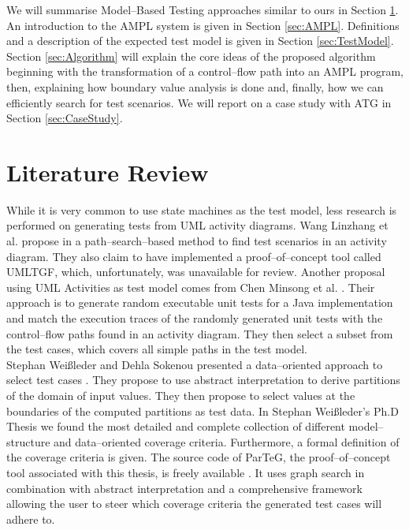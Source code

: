 \documentclass[runningheads,a4paper]{llncs}%
\begin{document}
We will summarise Model--Based Testing approaches similar to ours in Section \ref{sec:LiteratureReview}. An introduction to the AMPL system is given in Section \ref{sec:AMPL}. Definitions and a description of the expected test model is given in Section \ref{sec:TestModel}. Section \ref{sec:Algorithm} will explain the core ideas of the proposed algorithm beginning with the transformation of a control--flow path into an AMPL program, then, explaining how boundary value analysis is done and, finally, how we can efficiently search for test scenarios. We will report on a case study with ATG in Section \ref{sec:CaseStudy}.%
\section{Literature Review}%
\label{sec:LiteratureReview}%
While it is very common to use state machines as the test model, less research is performed on generating tests from UML activity diagrams. Wang Linzhang et al. propose in \cite{Linzhang04GeneratingTestCasefromActivityGrayBoxMethod} a path--search--based method to find test scenarios in an activity diagram. They also claim to have implemented a proof--of--concept tool called UMLTGF, which, unfortunately, was unavailable for review. Another proposal using UML Activities as test model comes from Chen Minsong et al. \cite{mingsong2006automatic}. Their approach is to generate random executable unit tests for a Java implementation and match the execution traces of the randomly generated unit tests with the control--flow paths found in an activity diagram. They then select a subset from the test cases, which covers all simple paths in the test model.\\%
Stephan Wei{\ss}leder and Dehla Sokenou presented a data--oriented approach to select test cases \cite{weissleder2008automatic}. They propose to use abstract interpretation to derive partitions of the domain of input values. They then propose to select values at the boundaries of the computed partitions as test data. In Stephan Wei{\ss}leder's Ph.D Thesis \cite{ParTeG} we found the most detailed and complete collection of different model--structure and data--oriented coverage criteria. Furthermore, a formal definition of the coverage criteria is given. The source code of ParTeG, the proof--of--concept tool associated with this thesis, is freely available \cite{PartegWebsite}. It uses graph search in combination with abstract interpretation and a comprehensive framework allowing the user to steer which coverage criteria the generated test cases will adhere to.\\%
\end{document}

